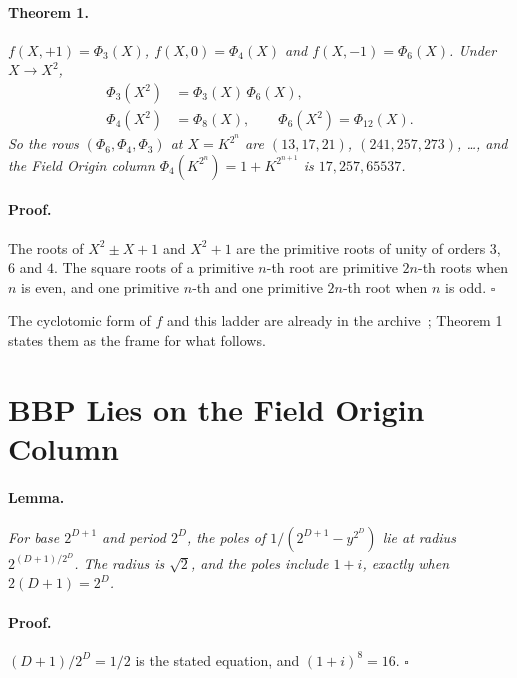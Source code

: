 \documentclass[twocolumn]{iopjournal}
\begin{document}
\paragraph{Theorem 1.} \textit{$f(X,+1) = \Phi_3(X)$,
$f(X,0) = \Phi_4(X)$ and $f(X,-1) = \Phi_6(X)$. Under $X \to X^2$,}
\begin{equation}
\begin{aligned}
  \Phi_3(X^2) &= \Phi_3(X)\,\Phi_6(X),\\
  \Phi_4(X^2) &= \Phi_8(X),\qquad \Phi_6(X^2) = \Phi_{12}(X).
\end{aligned}
\end{equation}
\textit{So the rows $(\Phi_6, \Phi_4, \Phi_3)$ at $X = K^{2^n}$ are
$(13, 17, 21)$, $(241, 257, 273)$, \dots, and the Field Origin
column $\Phi_4(K^{2^n}) = 1 + K^{2^{n+1}}$ is $17, 257, 65537$.}

\paragraph{Proof.} The roots of $X^2 \pm X + 1$ and $X^2 + 1$ are
the primitive roots of unity of orders $3$, $6$ and $4$. The square
roots of a primitive $n$-th root are primitive $2n$-th roots when $n$
is even, and one primitive $n$-th and one primitive $2n$-th root when
$n$ is odd. \hfill $\square$

\medskip
\noindent
The cyclotomic form of $f$ and this ladder are already in the
archive~\cite{Nelson2026cyclo}; Theorem 1 states them as the frame
for what follows.


\section*{BBP Lies on the Field Origin Column}

\paragraph{Lemma.} \textit{For base $2^{D+1}$ and period $2^D$, the
poles of $1/(2^{D+1} - y^{2^D})$ lie at radius $2^{(D+1)/2^D}$. The
radius is $\sqrt2$, and the poles include $1 + i$, exactly when
$2(D+1) = 2^D$.}

\paragraph{Proof.} $(D+1)/2^D = 1/2$ is the stated equation, and
$(1+i)^8 = 16$. \hfill $\square$
\end{document}
